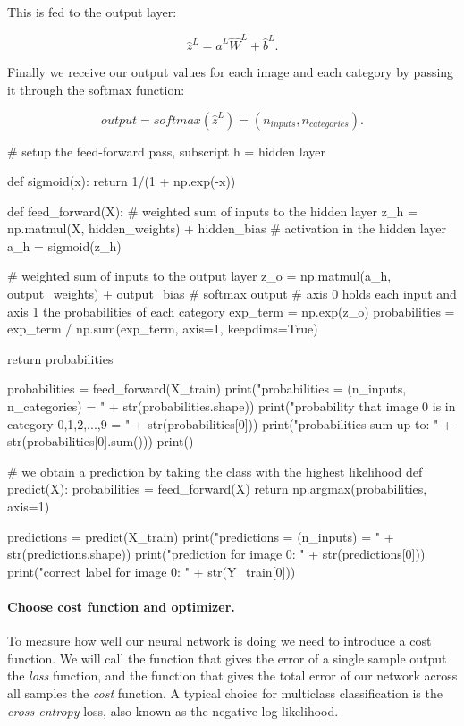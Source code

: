 \documentclass[%
oneside,                 %
final,                   %
10pt]{article}
\begin{document}
This is fed to the output layer:  

$$ \hat{z}^{L} = \hat{a}^{L} \hat{W}^{L} + \hat{b}^{L} .$$

Finally we receive our output values for each image and each category by passing it through the softmax function:  

$$ output = softmax (\hat{z}^{L}) = (n_{inputs}, n_{categories}) .$$


\bpycod
# setup the feed-forward pass, subscript h = hidden layer

def sigmoid(x):
    return 1/(1 + np.exp(-x))

def feed_forward(X):
    # weighted sum of inputs to the hidden layer
    z_h = np.matmul(X, hidden_weights) + hidden_bias
    # activation in the hidden layer
    a_h = sigmoid(z_h)
    
    # weighted sum of inputs to the output layer
    z_o = np.matmul(a_h, output_weights) + output_bias
    # softmax output
    # axis 0 holds each input and axis 1 the probabilities of each category
    exp_term = np.exp(z_o)
    probabilities = exp_term / np.sum(exp_term, axis=1, keepdims=True)
    
    return probabilities

probabilities = feed_forward(X_train)
print("probabilities = (n_inputs, n_categories) = " + str(probabilities.shape))
print("probability that image 0 is in category 0,1,2,...,9 = \n" + str(probabilities[0]))
print("probabilities sum up to: " + str(probabilities[0].sum()))
print()

# we obtain a prediction by taking the class with the highest likelihood
def predict(X):
    probabilities = feed_forward(X)
    return np.argmax(probabilities, axis=1)

predictions = predict(X_train)
print("predictions = (n_inputs) = " + str(predictions.shape))
print("prediction for image 0: " + str(predictions[0]))
print("correct label for image 0: " + str(Y_train[0]))
\epycod

\paragraph{Choose cost function and optimizer.}
To measure how well our neural network is doing we need to introduce a cost function.  
We will call the function that gives the error of a single sample output the \emph{loss} function, and the function
that gives the total error of our network across all samples the \emph{cost} function.
A typical choice for multiclass classification is the \emph{cross-entropy} loss, also known as the negative log likelihood.  
\end{document}
